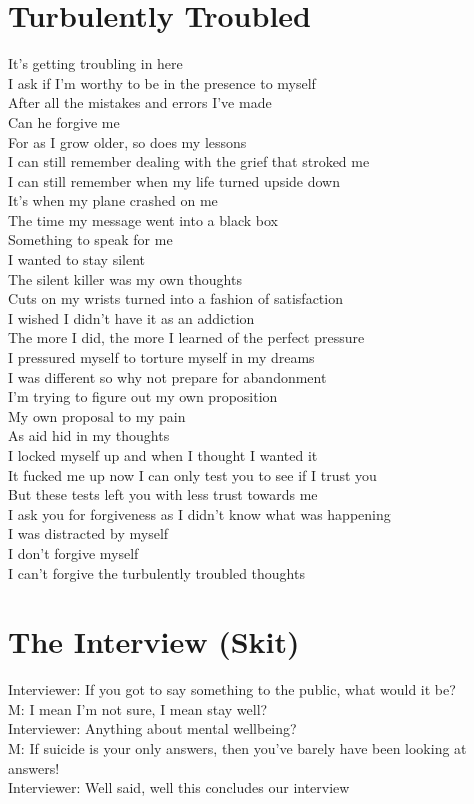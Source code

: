 \documentclass[12pt, b5paper, oneside]{book}
\begin{document}
\section{Turbulently Troubled}
It's getting troubling in here
\\I ask if I'm worthy to be in the presence to myself
\\After all the mistakes and errors I've made
\\Can he forgive me
\\For as I grow older, so does my lessons
\\I can still remember dealing with the grief that stroked me
\\I can still remember when my life turned upside down
\\It's when my plane crashed on me
\\The time my message went into a black box
\\Something to speak for me
\\I wanted to stay silent
\\The silent killer was my own thoughts
\\Cuts on my wrists turned into a fashion of satisfaction
\\I wished I didn't have it as an addiction
\\The more I did, the more I learned of the perfect pressure
\\I pressured myself to torture myself in my dreams
\\I was different so why not prepare for abandonment
\\I'm trying to figure out my own proposition
\\My own proposal to my pain
\\As aid hid in my thoughts
\\I locked myself up and when I thought I wanted it
\\It fucked me up now I can only test you to see if I trust you
\\But these tests left you with less trust towards me
\\I ask you for forgiveness as I didn't know what was happening
\\I was distracted by myself
\\I don't forgive myself
\\I can't forgive the turbulently troubled thoughts 
\newpage
\section{The Interview (Skit)}
Interviewer: If you got to say something to the public, what would it be?
\\M: I mean I'm not sure, I mean stay well?
\\Interviewer: Anything about mental wellbeing?
\\M: If suicide is your only answers, then you've barely have been looking at answers!
\\Interviewer: Well said, well this concludes our interview
\newpage
\end{document}
